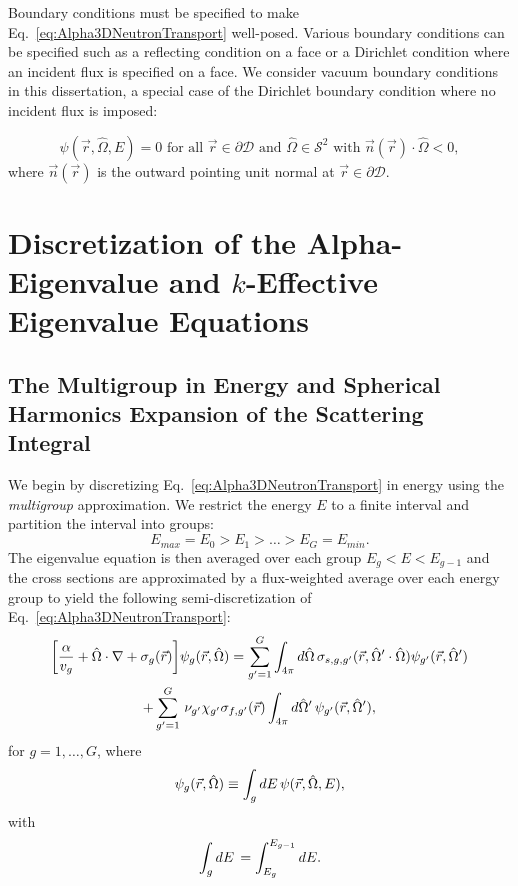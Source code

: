 Boundary conditions must be specified to make Eq.~\ref{eq:Alpha3DNeutronTransport} well-posed. Various boundary conditions can be specified such as a reflecting condition on a face or a Dirichlet condition where an incident flux is specified on a face. We consider vacuum boundary conditions in this dissertation, a special case of the Dirichlet boundary condition where no incident flux is imposed:

\begin{equation}
	\psi(\vec{r},\hat{\Omega},E) = 0 \text{ for all } \vec{r} \in \partial \mathcal{D} \text{ and } \hat{\Omega} \in \mathcal{S}^{2} \text{ with } \vec{n}(\vec{r}) \cdot \hat{\Omega} < 0,
\end{equation}
where $\vec{n}(\vec{r})$ is the outward pointing unit normal at $\vec{r} \in \partial \mathcal{D}$.

\section{Discretization of the Alpha-Eigenvalue and $k$-Effective Eigenvalue Equations}

\subsection{The Multigroup in Energy and Spherical Harmonics Expansion of the Scattering Integral}

We begin by discretizing Eq.~\ref{eq:Alpha3DNeutronTransport} in energy using the \textit{multigroup} approximation. We restrict the energy $E$ to a finite interval and partition the interval into groups:
\begin{equation*}
	E_{max} = E_{0} > E_{1} > \dots > E_{G} = E_{min}.
\end{equation*}
The eigenvalue equation is then averaged over each group $E_{g} < E < E_{g-1}$ and the cross sections are approximated by a flux-weighted average over each energy group to yield the following semi-discretization of Eq.~\ref{eq:Alpha3DNeutronTransport}:
\begin{multline}
	\bigg [ \frac{\alpha}{v_{g}} + \hat{\Omega} \cdot \nabla + \sigma_{g}(\vec{r}) \bigg ] \psi_{g}(\vec{r},\hat{\Omega}) = \sum_{g'=1}^{G} \int_{4\pi} \mathop{}\!d \hat{\Omega} \, \sigma_{s,g,g'}(\vec{r},\hat{\Omega}' \cdot \hat{\Omega}) \psi_{g'}(\vec{r},\hat{\Omega}') \\ + \sum_{g'=1}^{G} \, \nu_{g'} \chi_{g'} \sigma_{f,g'}(\vec{r}) \int_{4\pi} \mathop{}\!d \hat{\Omega}' \, \psi_{g'}(\vec{r},\hat{\Omega}'), 
	\label{eq:Alpha3DMG}
\end{multline}
for $g = 1, \dots, G$, where
\begin{equation}
	\psi_{g}(\vec{r},\hat{\Omega}) \equiv \int_{g} \mathop{}\!d E \, \psi(\vec{r},\hat{\Omega},E),
\end{equation}
with
\begin{equation}
	\int_{g} \mathop{}\!d E \, = \int_{E_{g}}^{E_{g-1}} \mathop{}\!d E.
\end{equation}

